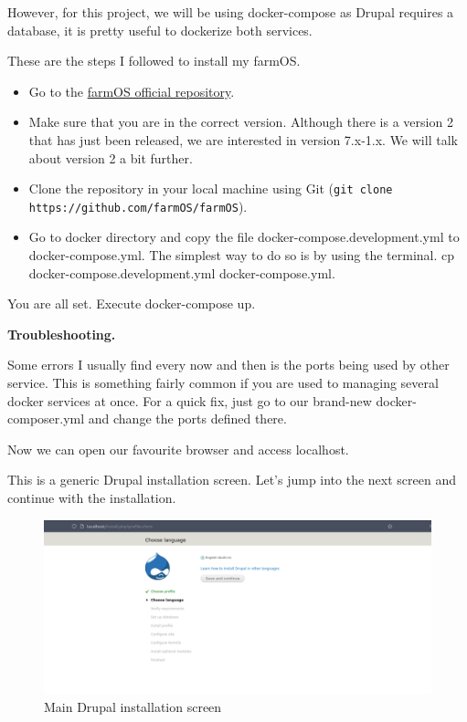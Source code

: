 However, for this project, we will be using docker-compose as Drupal requires a database, it is pretty useful to dockerize both services.

These are the steps I followed to install my farmOS.
\begin{itemize}
    \item Go to the \href{https://github.com/farmOS/farmOS}{farmOS official repository}.
    \item Make sure that you are in the correct version. Although there is a version 2 that has just been released, we are interested in version 7.x-1.x. We will talk about version 2 a bit further.
    \item Clone the repository in your local machine using Git (\verb|git clone https://github.com/farmOS/farmOS|).
    \item Go to docker directory and copy the file docker-compose.development.yml to docker-compose.yml. The simplest way to do so is by using the terminal. cp docker-compose.development.yml docker-compose.yml.
\end{itemize}

You are all set. Execute docker-compose up.


\textbf{Troubleshooting.}

Some errors I usually find every now and then is the ports being used by other service. This is something fairly common if you are used to managing several docker services at once. For a quick fix, just go to our brand-new docker-composer.yml and change the ports defined there.

Now we can open our favourite browser and access localhost.

This is a generic Drupal installation screen. Let's jump into the next screen and continue with the installation.

\begin{figure}[H]
    \centering
    \includegraphics[width=1\textwidth]{fig/drupal-install/farmos-drupal-install.png}
    \caption{Main Drupal installation screen}
    \label{fig:farmos-drupal-install}
\end{figure}

